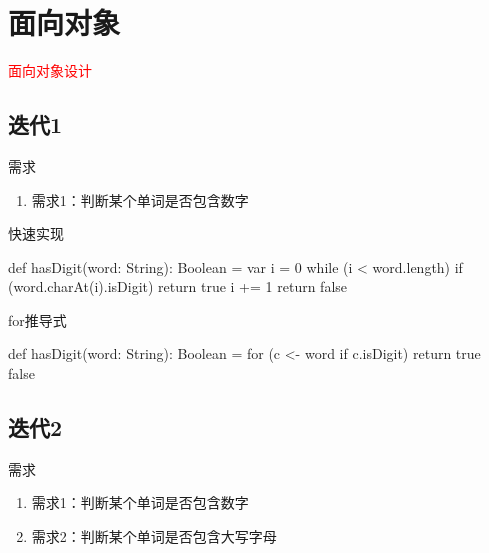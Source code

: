 \section{面向对象}
\label{sec:oodesign}

\begin{frame}
  \begin{center}
    \Huge{\textcolor{red}{面向对象设计}}
  \end{center}
\end{frame}

\subsection{迭代1}

\begin{frame}{需求}
  \begin{block}{}
    \begin{enumerate}
      \item \alert{需求1}：判断某个单词是否包含数字
    \end{enumerate}
  \end{block}
\end{frame}

\begin{frame}[fragile]{快速实现}
  \begin{scala}
def hasDigit(word: String): Boolean = {
  var i = 0
  while (i < word.length) {
    if (word.charAt(i).isDigit) 
      return true
    i += 1
  }
  return false
}
  \end{scala}
\end{frame}

\begin{frame}[fragile]{for推导式}
  \begin{scala}
def hasDigit(word: String): Boolean = {
  for (c <- word if c.isDigit) 
    return true
  false
}
  \end{scala}
\end{frame}

\subsection{迭代2}

\begin{frame}{需求}
  \begin{block}{}
    \begin{enumerate}
    \item \alert{需求1}：判断某个单词是否包含数字
    \item \alert{需求2}：判断某个单词是否包含大写字母
    \end{enumerate}
  \end{block}
\end{frame}

